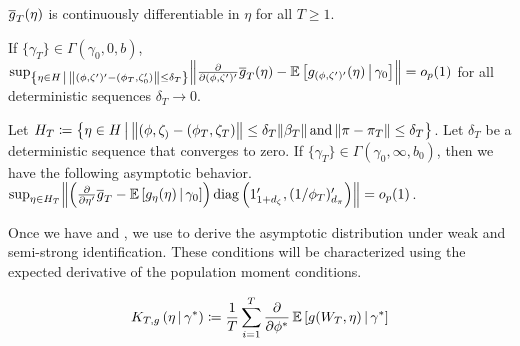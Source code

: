 \documentclass[11pt, letterpaper, twoside, final]{article}
\begin{document}
\begin{appendices}
    
    
    \begin{assump}[GMM 2*]\label{ass:GMM2}
    \begin{assumplist}
        \item $\overline{g}_T(\eta)$ is continuously differentiable in $\eta$ for all $T \geq 1$. 
            \label{ass:GMM2a}
        \item If $\{\gamma_T\} \in \Gamma\left(\gamma_0, 0, b\right)$, $\sup_{\left\lbrace \eta \in \Eta \mvert
            \norm*{(\phi, \zeta')' - (\phi_T, \zeta_0')} \leq \delta_T \right\rbrace}
            \norm*{\frac{\partial}{\partial (\phi, \zeta')'} \sampmom(\eta) - \E\left[\popmom_{(\phi,
            \zeta')'}(\eta) \mvert \gamma_0\right]} = o_p(1)$ for all deterministic sequences  $\delta_T \to 0$.
            \label{ass:GMM2b}
        \item  Let $\Eta_T \coloneqq \left\lbrace \eta \in \Eta \mvert \norm*{(\phi, \zeta_) - (\phi_T, \zeta_T)}
            \leq \delta_T \norm*{\beta_T}\, \text{and}\, \norm*{\pi - \pi_T} \leq \delta_T \right\rbrace$.  Let
            $\delta_T$ be a deterministic sequence that converges to zero.  If $\{\gamma_T \} \in
            \Gamma\left(\gamma_0, \infty, b_0\right)$, then we have the following asymptotic behavior.
            $\sup_{\eta \in \Eta_T} \norm*{\left(\frac{\partial}{\partial \eta'} \overline{g}_T -
            \E\left[g_{\eta}(\eta) \mvert \gamma_0\right]\right) \diag\left(1_{1+d_\zeta}',
            (1/\phi_T)_{d_{\pi}}'\right)}  = o_p(1)$. 
            \label{ass:GMM2c}
    \end{assumplist}
    \end{assump}
    
    Once we have  and , we use  to derive the asymptotic
    distribution under weak and semi-strong identification.
    These conditions will be characterized using the expected derivative of the population moment conditions. 
    
    \begin{defn}
        \label{defn:moment_derivative_func}
        \begin{equation}
            K_{T,g}\left(\eta \,\middle\vert\, \gamma^{*}\right) \coloneqq  \frac{1}{T} \sum_{i=1}^T \frac{\partial}{\partial
            \phi^{*}} \operatorname{\mathbb{E}} \left[ g(W_T, \eta) \,\middle\vert\, \gamma^{*} \right]
        \end{equation}
    \end{defn}
    

\end{appendices}
\end{document}
